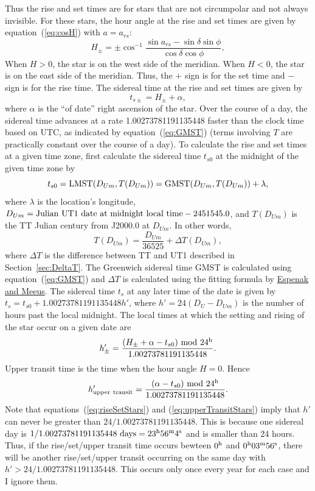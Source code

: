 \documentclass[12pt]{article}
\newcommand \beq {\begin{equation}}
\newcommand \eeq {\end{equation}}
\begin{document}
Thus the rise and set times are for stars that are not circumpolar and not always 
invisible. For these stars, the hour angle at the rise and set times are given by 
equation~(\ref{eq:cosH}) with $a=a_{rs}$: 
\beq
  H_{\pm} = \pm \cos^{-1} \frac{\sin a_{rs} - \sin \delta \sin \phi}{\cos \delta \cos \phi} ,
\eeq
When $H>0$, the star is on the west side of the meridian. When $H<0$, the star is 
on the east side of the meridian. Thus, the $+$ sign is for the set time and $-$ sign is 
for the rise time. The sidereal time at the rise and set times are given by 
\beq
  t_{s\pm}= H_{\pm} + \alpha ,
\eeq
where $\alpha$ is the ``of date'' right ascension of the star. Over the course 
of a day, the sidereal time advances at a rate 1.00273781191135448 faster than 
the clock time based on UTC, as indicated by equation~(\ref{eq:GMST}) (terms involving 
$T$ are practically constant over the course of a day). To calculate the 
rise and set times at a given time zone, first calculate the sidereal time $t_{s0}$ 
at the midnight of the given time zone by 
\beq
  t_{s0}={\rm LMST}(D_{Um},T(D_{Um})) = {\rm GMST}(D_{Um},T(D_{Um})) + \lambda ,
\eeq
where $\lambda$ is the location's longitude, 
$D_{Um}= {\rm Julian~UT1~date~at~midnight~local~time}-2451545.0$, and $T(D_{Um})$ 
is the TT Julian century from J2000.0 at $D_{Um}$. In other words, 
\beq
  T(D_{Um}) = \frac{D_{Um}}{36525} + \Delta T(D_{Um}) ,
\eeq
where $\Delta T$ is the difference between TT and UT1 described in Section~\ref{sec:DeltaT}. 
The Greenwich sidereal time GMST is calculated using equation~(\ref{eq:GMST}) and 
$\Delta T$ is calculated using the fitting formula by 
\href{https://eclipse.gsfc.nasa.gov/SEcat5/deltatpoly.html}{Espenak and Meeus}. 
The sidereal time $t_s$ at any later time of the date is given by 
$t_s=t_{s0}+1.00273781191135448 h'$, where $h'=24(D_U-D_{Um})$ is the number of hours 
past the local midnight. The local times at which the setting and rising of the star 
occur on a given date are 
\beq
  h'_{\pm} = \frac{(H_{\pm} + \alpha - t_{s0})~{\rm mod}~24^{\rm h}}{1.00273781191135448} .
\label{eq:riseSetStars}
\eeq
Upper transit time is the time when the hour angle $H=0$. Hence 
\beq
  h'_{\rm upper~transit} = \frac{(\alpha - t_{s0})~{\rm mod}~24^{\rm h}}{1.00273781191135448} .
\label{eq:upperTransitStars}
\eeq
Note that equations~(\ref{eq:riseSetStars}) and (\ref{eq:upperTransitStars}) imply 
that $h'$ can never be greater than $24/1.00273781191135448$. This is because 
one sidereal day is $1/1.00273781191135448~{\rm days}=23^{\rm h} 56^{\rm m} 
4^{\rm s}$ and is smaller than 24 hours. Thus, if the rise/set/upper transit 
time occurs bewteen $0^{\rm h}$ and $0^{\rm h} 03^{\rm m} 56^{\rm s}$, there will 
be another rise/set/upper transit occurring on the same day with 
$h' > 24/1.00273781191135448$. This occurs only once every year for each case 
and I ignore them.
\end{document}
